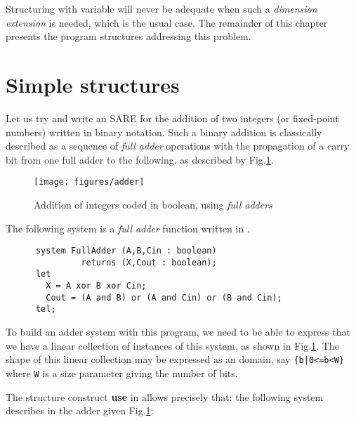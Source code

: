 Structuring with variable will never be adequate when such a
\emph{dimension extension} is needed, which
is the usual case.  The remainder of this chapter presents the {\alfa}
program structures addressing this problem.



\section{Simple structures} 

Let us try and write an {\alfa} SARE for the addition of two integers
(or fixed-point numbers) written in binary notation.  Such a binary
addition is classically described as a sequence of \emph{full adder}
operations with the propagation of a carry bit from one full adder to
the following, as described by Fig.\ref{adder}.

\begin{figure}[!ht]
  \centerline{
    \texttt{[image: figures/adder]}
  }
\caption{Addition of integers coded in boolean, using \emph{full adders}\label{adder}}
\end{figure}

The following system is a \emph{full adder} function written in {\alfa}. 

\begin{verbatim}
      system FullAdder (A,B,Cin : boolean) 
               returns (X,Cout : boolean);
      let
        X = A xor B xor Cin;
        Cout = (A and B) or (A and Cin) or (B and Cin);
      tel;
\end{verbatim}



To build an adder system with this program, we need to be able to
express that we have a linear collection of instances of this system,
as shown in Fig.\ref{adder}. The shape of this linear collection may
be expressed as an {\alfa} domain, say \texttt{\{b|0<=b<W\}} where
\texttt{W} is a size parameter giving the number of bits.

The structure construct \textbf{use} in {\alfa} allows precisely that:
the following system describes in {\alfa} the adder given Fig.\ref{adder}: 

